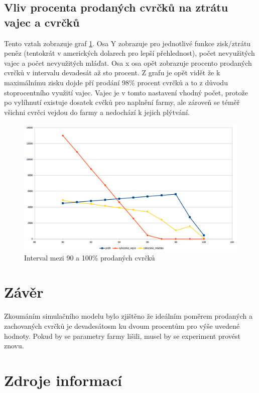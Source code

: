 \documentclass[a4paper, 12pt]{extarticle}
\begin{document}
\newpage
\subsection{Vliv procenta prodaných cvrčků na ztrátu vajec a cvrčků}
 Tento vztah zobrazuje graf \ref{chart3}. Osa Y zobrazuje pro jednotlivé funkce zisk/ztrátu peněz (tentokrát v amerických dolarech pro lepší přehlednost), počet nevyužitých vajec a počet nevyužitých mláďat. Osa x osa  opět zobrazuje procento prodaných cvrčků v intervalu devadesát až sto procent. Z grafu je opět vidět že k maximálnímu zisku dojde pří prodání 98\% procent cvrčků a to z důvodu stoprocentního využití vajec. Vajec je v tomto nastavení vhodný počet, protože po vylíhnutí existuje dosatek cvčků pro naplnění farmy, ale zároveň se téměř všichni cvrčci vejdou do farmy a nedochází k jejich plýtvání.

\begin{figure}[h]
\includegraphics[width=\linewidth]{chart3.png}
\caption{Interval mezi 90 a 100\% prodaných cvrčků} \label{chart3}
\end{figure}

\section{Závěr}
Zkoumáním simulačního modelu bylo zjištěno že ideálním poměrem prodaných a zachovaných cvrčků je devadesátosm ku dvoum procentům pro výše uvedené hodnoty. Pokud by se parametry farmy lišili, musel by se experiment provést znovu.

\newpage

\section{Zdroje informací} \label{zdroje}
\setlength\parindent{0pt}
\end{document}
